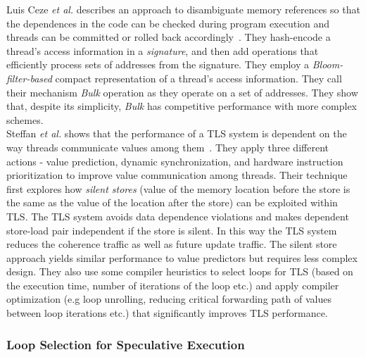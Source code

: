 \documentclass[10pt]{report}          %
\begin{document}
Luis Ceze \textit{et al.} describes an approach to disambiguate memory references so that the dependences in the code can be checked during program execution and threads can be committed or rolled back accordingly~\cite{bulk}.  They hash-encode a thread's access information in a \textit{signature}, and then add operations that efficiently process sets of addresses from the signature.  They employ a \textit{Bloom-filter-based} compact representation of a thread's access information.  They call their mechanism \textit{Bulk} operation as they operate on a set of addresses.  They show that, despite its simplicity, \textit{Bulk} has competitive performance with more complex schemes.\\
Steffan\textit{ et al.} shows that the performance of a TLS system is dependent on the way threads communicate values among them~\cite{value_communication}.  They apply three different actions - value prediction, dynamic synchronization, and hardware instruction prioritization to improve value communication among threads. Their technique first explores how \textit{silent stores} (value of the memory location before the store is the same as the value of the location after the store) can be exploited within TLS. The TLS system avoids data dependence violations and makes dependent store-load pair independent if the store is silent.  In this way the TLS system reduces the coherence traffic as well as future update traffic. The silent store approach yields similar performance to value predictors but requires less complex design.  They also use some compiler heuristics to select loops for TLS (based on the execution time, number of iterations of the loop etc.) and apply compiler optimization (e.g loop unrolling, reducing critical forwarding path of values between loop iterations etc.) that significantly improves TLS performance.\\

\subsubsection{Loop Selection for Speculative Execution}
\end{document}
